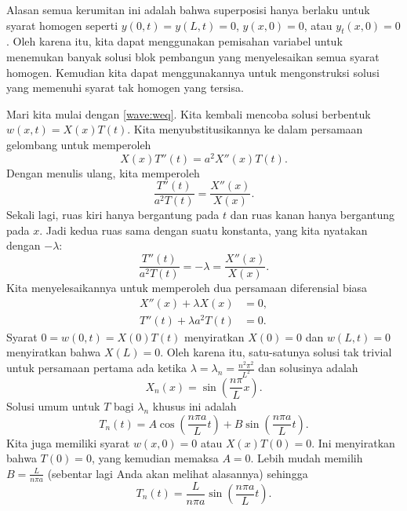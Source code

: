 Alasan semua kerumitan ini adalah bahwa superposisi hanya berlaku untuk
syarat homogen seperti
$y(0,t) = y(L,t) = 0$, $y(x,0) = 0$, atau $y_t(x,0) = 0$.  Oleh karena itu,
kita dapat
menggunakan pemisahan variabel untuk menemukan banyak solusi blok pembangun
yang menyelesaikan semua syarat homogen.  Kemudian kita dapat menggunakannya untuk
mengonstruksi solusi yang memenuhi syarat tak homogen yang tersisa.

Mari kita mulai dengan \eqref{wave:weq}.
Kita kembali mencoba solusi berbentuk $w(x,t) = X(x) T(t)$.  Kita menyubstitusikannya ke dalam
persamaan gelombang untuk memperoleh
\begin{equation*}
X(x)T''(t) = a^2 X''(x) T(t) .
\end{equation*}
Dengan menulis ulang, kita memperoleh
\begin{equation*}
\frac{T''(t)}{a^2 T(t)} = \frac{X''(x)}{X(x)} .
\end{equation*}
Sekali lagi, ruas kiri hanya bergantung pada $t$ dan ruas kanan hanya bergantung
pada $x$.  Jadi kedua ruas sama dengan suatu konstanta, yang kita nyatakan dengan
$-\lambda$:
\begin{equation*}
\frac{T''(t)}{a^2 T(t)} = -\lambda = \frac{X''(x)}{X(x)} .
\end{equation*}
Kita menyelesaikannya untuk memperoleh dua persamaan diferensial biasa
\begin{align*}
X''(x) + \lambda X(x) &= 0 , \\
T''(t) + \lambda a^2 T(t) &= 0 .
\end{align*}
Syarat $0 = w(0,t) = X(0) T(t)$ menyiratkan $X(0) = 0$ dan
$w(L,t) = 0$ menyiratkan bahwa $X(L) = 0$.  Oleh karena itu, satu-satunya solusi
tak trivial untuk persamaan pertama ada ketika
$\lambda = \lambda_n = \frac{n^2 \pi^2}{L^2}$ dan solusinya adalah
\begin{equation*}
X_n(x) = \sin \left( \frac{n \pi}{L} x \right) .
\end{equation*}
Solusi umum untuk $T$ bagi $\lambda_n$ khusus ini adalah
\begin{equation*}
T_n(t) = A \cos \left( \frac{n \pi a}{L} t \right)
+ B \sin \left( \frac{n \pi a}{L} t \right).
\end{equation*}
Kita juga memiliki syarat $w(x,0) = 0$ atau $X(x)T(0) = 0$.  Ini
menyiratkan bahwa $T(0) = 0$, yang kemudian memaksa $A = 0$.  Lebih
mudah memilih $B=\frac{L}{n \pi a}$ (sebentar lagi Anda akan melihat alasannya)
sehingga
\begin{equation*}
T_n(t) = \frac{L}{n \pi a} \sin \left( \frac{n \pi a}{L} t \right).
\end{equation*}
